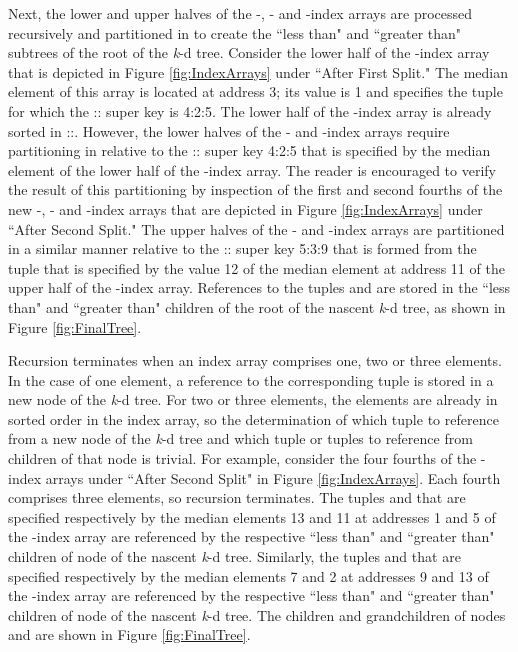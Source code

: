 \documentclass{sig-alternate}
\begin{document}
Next, the lower and upper halves of the -, - and -index arrays are processed recursively and partitioned in  to create the ``less than" and ``greater than" subtrees of the root of the \emph{k}-d tree.  Consider the lower half of the -index array that is depicted in Figure \ref{fig:IndexArrays} under ``After First Split."  The median element of this array is located at address 3; its value is 1 and specifies the tuple  for which the :: super key is 4:2:5.  The lower half of the -index array is already sorted in ::.  However, the lower halves of the - and -index arrays require partitioning in  relative to the :: super key 4:2:5 that is specified by the median element of the lower half of the -index array.  The reader is encouraged to verify the result of this partitioning by inspection of the first and second fourths of the new -, - and -index arrays that are depicted in Figure \ref{fig:IndexArrays} under ``After Second Split."  The upper halves of the - and -index arrays are partitioned in a similar manner relative to the :: super key 5:3:9 that is formed from the tuple  that is specified by the value 12 of the median element at address 11 of the upper half of the -index array.  References to the tuples  and  are stored in the ``less than" and ``greater than" children of the root of the nascent \emph{k}-d tree, as shown in Figure \ref{fig:FinalTree}.

Recursion terminates when an index array comprises one, two or three elements.  In the case of one element, a reference to the corresponding tuple is stored in a new node of the \emph{k}-d tree.  For two or three elements, the elements are already in sorted order in the index array, so the determination of which tuple to reference from a new node of the \emph{k}-d tree and which tuple or tuples to reference from children of that node is trivial.  For example, consider the four fourths of the -index arrays under ``After Second Split" in Figure \ref{fig:IndexArrays}.  Each fourth comprises three elements, so recursion terminates.  The tuples  and  that are specified respectively by the median elements 13 and 11 at addresses 1 and 5 of the -index array are referenced by the respective ``less than" and ``greater than" children of node  of the nascent \emph{k}-d tree.  Similarly, the tuples  and  that are specified respectively by the median elements 7 and 2 at addresses 9 and 13 of the -index array are referenced by the respective ``less than" and ``greater than" children of node  of the nascent \emph{k}-d tree.  The children and grandchildren of nodes  and  are shown in Figure \ref{fig:FinalTree}.
\end{document}
